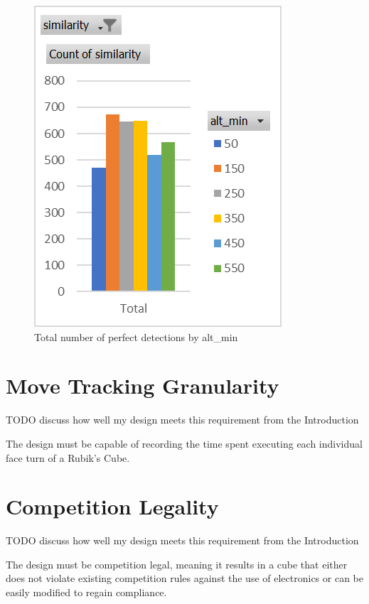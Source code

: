 \begin{figure}[h]
    \centering
    \caption{Total number of perfect detections by alt\_min}
    \label{fig:perfect-detections-by-alt-min}
    \includegraphics[width=0.75\linewidth]{Figures/7 Evaluation/perfect_detections_by_alt_min.png}
\end{figure}



\section{Move Tracking Granularity}

TODO discuss how well my design meets this requirement from the Introduction

The design must be capable of recording the time spent executing each individual face turn of a Rubik's Cube.


\section{Competition Legality}

TODO discuss how well my design meets this requirement from the Introduction

The design must be competition legal, meaning it results in a cube that either does not violate existing competition rules against the use of electronics or can be easily modified to regain compliance.

